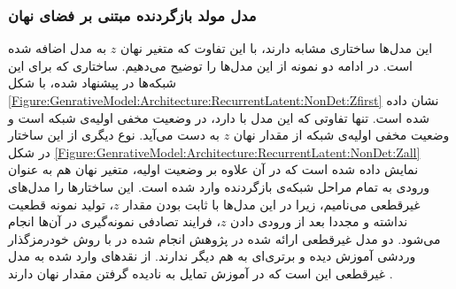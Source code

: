  \subsubsection{ مدل‌ مولد بازگردنده مبتنی بر فضای نهان}
 \label{Model:Generative:Latent:RNN} 
این مدل‌ها ساختاری مشابه
دارند، با این تفاوت که متغیر نهان $z$ به مدل اضافه شده است. در ادامه دو نمونه از این مدل‌ها را توضیح می‌دهیم.
\newline
ساختاری که برای این شبکه‌ها در 
\cite{Bowman2016VAE}
پیشنهاد شده، با شکل
\ref{Figure:GenrativeModel:Architecture:RecurrentLatent:NonDet:Zfirst}
نشان داده شده است. تنها تفاوتی که این مدل با
دارد، در وضعیت مخفی اولیه‌ی شبکه است و وضعیت مخفی اولیه‌ی شبکه از مقدار نهان $z$ به دست می‌آید.
نوع دیگری از این ساختار در شکل
\ref{Figure:GenrativeModel:Architecture:RecurrentLatent:NonDet:Zall}
نمایش داده شده است که در آن علاوه بر وضعیت اولیه، متغیر نهان هم به عنوان ورودی به تمام مراحل شبکه‌ی بازگردنده وارد شده است. این ساختارها را مدل‌های غیرقطعی می‌نامیم، زیرا در این مدل‌ها با ثابت بودن مقدار $z$، تولید نمونه قطعیت نداشته و مجددا بعد از ورودی دادن $z$، فرایند تصادفی نمونه‌گیری در آن‌ها انجام می‌شود.
دو مدل غیرقطعی ارائه شده در پژوهش انجام شده در
\cite{Bowman2016VAE}
با روش خودرمزگذار وردشی آموزش دیده و برتری‌ای به هم دیگر ندارند. 
از نقد‌های وارد شده به مدل غیرقطعی این است که در آموزش تمایل به نادیده گرفتن مقدار نهان دارند
\cite{Yang2017ImprovedVAE, Bowman2016VAE}.
